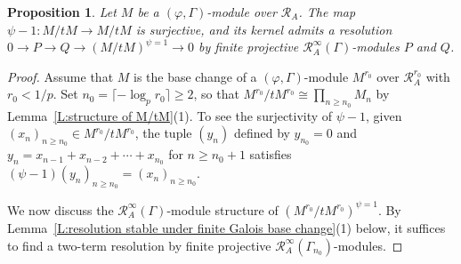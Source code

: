 \documentclass[12pt]{article}
\newtheorem{prop}[theorem]{Proposition}
\theoremstyle{definition}
\numberwithin{equation}{theorem}
\newcommand{\calR}{\mathcal{R}}
\begin{document}
\begin{prop}
\label{P:finite-torsion}
Let $M$ be a $(\varphi,\Gamma)$-module over $\calR_A$.
The map $\psi-1: M / tM \to M/tM$ is surjective, and its kernel admits a resolution $0 \to P \to Q \to (M/tM)^{\psi=1} \to 0$ by finite projective $\calR_A^\infty(\Gamma)$-modules $P$ and $Q$.
\end{prop}
\begin{proof}
Assume that $M$ is the base change of a $(\varphi, \Gamma)$-module $M^{r_0}$ over $\calR_A^{r_0}$ with $r_0<1/p$.  Set $n_0 = \lceil -\log_p r_0 \rceil \geq 2$, so that $M^{r_0} / tM^{r_0} \cong \prod_{n \geq n_0}M_n$ by Lemma~\ref{L:structure of M/tM}(1).  To see the surjectivity of $\psi -1$, given $(x_n)_{n \geq n_0} \in M^{r_0}/tM^{r_0}$, the tuple $(y_n)$ defined by $y_{n_0} = 0$ and $y_n = x_{n-1} + x_{n-2} + \cdots +x_{n_0}$ for $n \geq n_0+1$ satisfies $(\psi-1)(y_n)_{n \geq n_0} = (x_n)_{n \geq n_0}$.

We now discuss the $\calR_A^\infty(\Gamma)$-module structure of
$(M^{r_0}/tM^{r_0})^{\psi=1}$.  By Lemma~\ref{L:resolution stable
  under finite Galois base change}(1) below, it suffices to find a
two-term resolution by finite projective
$\calR_A^\infty(\Gamma_{n_0})$-modules.


\end{proof}
\end{document}
